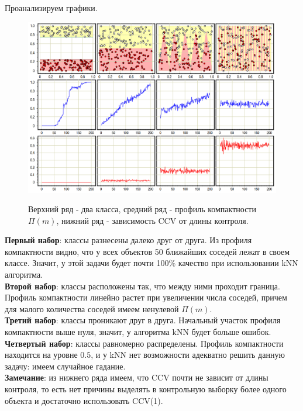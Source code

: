 \noindent
Проанализируем графики.

\begin{figure}[ht]
	\centering
	\includegraphics[width=\textwidth]{chapters/metric/images/compact.png}
	\label{fig:compact}
	\caption{
		Верхний ряд - два класса, средний ряд - профиль компактности $\Pi(m)$, нижний ряд - зависимость CCV от длины контроля.
	}
\end{figure}

\noindent
\textbf{Первый набор}: классы разнесены далеко друг от друга. Из профиля компактности видно, что у всех объектов 50 ближайших соседей лежат в своем классе. Значит, у этой задачи будет почти 100\% качество при использовании kNN алгоритма. \\

\noindent
\textbf{Второй набор}: классы расположены так, что между ними проходит граница. Профиль компактности линейно растет при увеличении числа соседей, причем для малого количества соседей имеем ненулевой $\Pi(m)$. \\

\noindent
\textbf{Третий набор}: классы проникают друг в друга. Начальный участок профиля компактности выше нуля, значит, у алгоритма kNN будет больше ошибок. \\

\noindent
\textbf{Четвертый набор}: классы равномерно распределены. Профиль компактности находится на уровне $0.5$, и у kNN нет возможности адекватно решить данную задачу: имеем случайное гадание. \\

\noindent
\textbf{Замечание}: из нижнего ряда имеем, что CCV почти не зависит от длины контроля, то есть нет причины выделять в контрольную выборку более одного объекта и достаточно использовать CCV(1).



